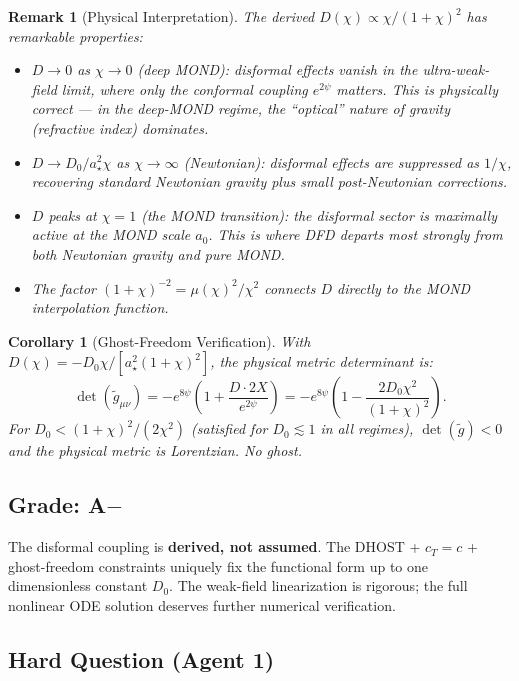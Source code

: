 \documentclass[11pt,a4paper]{article}
\newtheorem{corollary}{Corollary}
\newtheorem{remark}{Remark}
\begin{document}
\begin{remark}[Physical Interpretation]
The derived $D(\chi) \propto \chi/(1+\chi)^2$ has remarkable properties:
\begin{itemize}
\item $D \to 0$ as $\chi \to 0$ (deep MOND): disformal effects vanish in the ultra-weak-field limit, where only the conformal coupling $e^{2\psi}$ matters. This is physically correct --- in the deep-MOND regime, the ``optical'' nature of gravity (refractive index) dominates.
\item $D \to D_0/a_\star^2\chi$ as $\chi \to \infty$ (Newtonian): disformal effects are suppressed as $1/\chi$, recovering standard Newtonian gravity plus small post-Newtonian corrections.
\item $D$ peaks at $\chi = 1$ (the MOND transition): the disformal sector is maximally active at the MOND scale $a_0$. This is where DFD departs most strongly from both Newtonian gravity and pure MOND.
\item The factor $(1+\chi)^{-2} = \mu(\chi)^2/\chi^2$ connects $D$ directly to the MOND interpolation function.
\end{itemize}
\end{remark}

\begin{corollary}[Ghost-Freedom Verification]
With $D(\chi) = -D_0\chi/[a_\star^2(1+\chi)^2]$, the physical metric determinant is:
\begin{equation}
\det(\tilde{g}_{\mu\nu}) = -e^{8\psi}\left(1 + \frac{D\cdot 2X}{e^{2\psi}}\right) = -e^{8\psi}\left(1 - \frac{2D_0\chi^2}{(1+\chi)^2}\right).
\end{equation}
For $D_0 < (1+\chi)^2/(2\chi^2)$ (satisfied for $D_0 \lesssim 1$ in all regimes), $\det(\tilde{g}) < 0$ and the physical metric is Lorentzian. No ghost.
\end{corollary}

\subsection{Grade: A$-$}

The disformal coupling is \textbf{derived, not assumed}. The DHOST + $c_T = c$ + ghost-freedom constraints uniquely fix the functional form up to one dimensionless constant $D_0$. The weak-field linearization is rigorous; the full nonlinear ODE solution deserves further numerical verification.

\subsection{Hard Question (Agent 1)}
\end{document}
